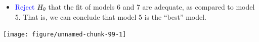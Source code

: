 \documentclass{article}\usepackage[]{graphicx}\usepackage[svgnames]{xcolor}
\newenvironment{knitrout}{}{} %
\newcommand{\HN}{\textsl{H}_{\textsl{0}}}%
\begin{document}
\begin{itemize}
      \item \textcolor{Blue}{Reject} $ \HN $ that the fit of models 6 and 7 are adequate, as compared to model 5. That is,
            we can conclude that model 5 is the ``best'' model.
\end{itemize}
\begin{knitrout}
\color{fgcolor}

{\centering \texttt{[image: figure/unnamed-chunk-99-1]} 

}


\end{knitrout}
\end{document}
